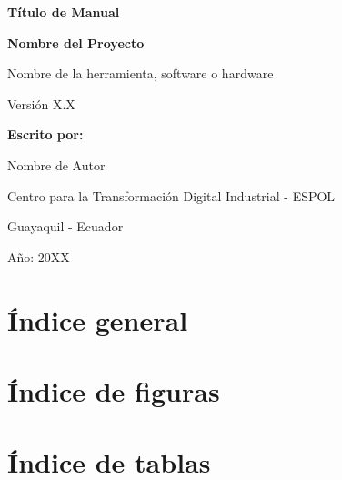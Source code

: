 \documentclass[12pt, a4paper]{article}
\begin{document}

\begin{titlepage}
    \vspace*{\fill}
    \centering
    {\bfseries\fontsize{18}{18}\selectfont Título de Manual \par}
    \vspace{1cm}
    {\bfseries\fontsize{16}{16}\selectfont Nombre del Proyecto\par}
    \vspace{2cm}
    {\fontsize{14}{14}\selectfont Nombre de la herramienta, software o hardware\par}
    \vspace{2cm}
    {\fontsize{14}{14}\selectfont Versión X.X\par}
    \vspace{2cm}
    {\bfseries\fontsize{14}{14}\selectfont Escrito por:\par}
    \vspace{0.25cm}
    {\fontsize{14}{14}\selectfont Nombre de Autor\par}
    \vspace{2cm}
    {\fontsize{14}{14}\selectfont Centro para la Transformación Digital Industrial - ESPOL\par}
    \vspace{0.25cm}
    {\fontsize{14}{14}\selectfont Guayaquil - Ecuador\par}
    \vspace{0.25cm}
    {\fontsize{14}{14}\selectfont Año: 20XX\par}
    \vspace*{\fill}
\end{titlepage}


\part*{Índice general}
\tableofcontents
\newpage


\part*{Índice de figuras}
\listoffigures
\newpage


\part*{Índice de tablas}
\listoftables
\newpage
\end{document}
